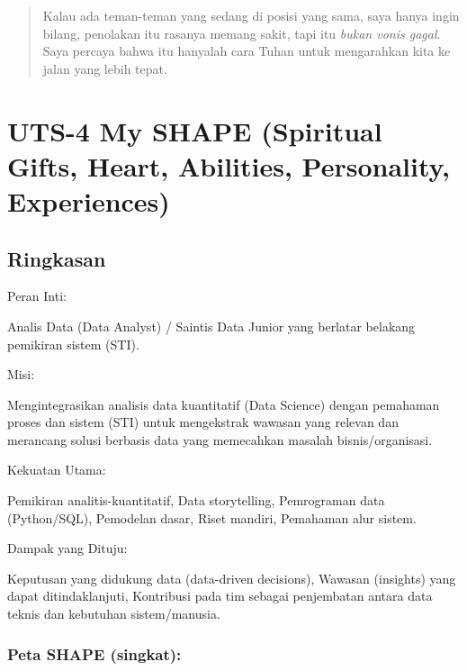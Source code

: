 \documentclass[
  letterpaper,
  DIV=11,
  numbers=noendperiod]{scrreprt}
\begin{document}
\begin{quote}
Kalau ada teman-teman yang sedang di posisi yang sama, saya hanya ingin
bilang, penolakan itu rasanya memang sakit, tapi itu \emph{bukan vonis
gagal}. Saya percaya bahwa itu hanyalah cara Tuhan untuk mengarahkan
kita ke jalan yang lebih tepat.
\end{quote}


\chapter{UTS-4 My SHAPE (Spiritual Gifts, Heart, Abilities, Personality,
Experiences)}\label{uts-4-my-shape-spiritual-gifts-heart-abilities-personality-experiences}

\section{Ringkasan}\label{ringkasan}

Peran Inti:

Analis Data (Data Analyst) / Saintis Data Junior yang berlatar belakang
pemikiran sistem (STI).

Misi:

Mengintegrasikan analisis data kuantitatif (Data Science) dengan
pemahaman proses dan sistem (STI) untuk mengekstrak wawasan yang relevan
dan merancang solusi berbasis data yang memecahkan masalah
bisnis/organisasi.

Kekuatan Utama:

Pemikiran analitis-kuantitatif, Data storytelling, Pemrograman data
(Python/SQL), Pemodelan dasar, Riset mandiri, Pemahaman alur sistem.

Dampak yang Dituju:

Keputusan yang didukung data (data-driven decisions), Wawasan (insights)
yang dapat ditindaklanjuti, Kontribusi pada tim sebagai penjembatan
antara data teknis dan kebutuhan sistem/manusia.

\subsection{Peta SHAPE (singkat):}\label{peta-shape-singkat}
\end{document}
